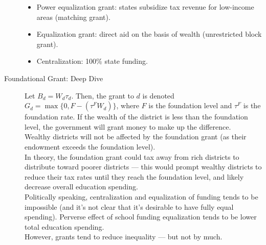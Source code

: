 \documentclass[10pt]{extarticle}
\begin{document}
\begin{description}
\begin{itemize}
          \item Power equalization grant: states subsidize tax revenue for low-income areas (matching grant).
          \item Equalization grant: direct aid on the basis of wealth (unrestricted block grant).
          \item Centralization: 100\% state funding.
        \end{itemize}
    \item[Foundational Grant: Deep Dive] Let $B_{d} = W_{d}\tau_d$. Then, the grant to $d$ is denoted $G_d = \max\{0,F - (\tau^{F}W_d)\}$, where $F$ is the foundation level and $\tau^{F}$ is the foundation rate. If the wealth of the district is less than the foundation level, the government will grant money to make up the difference.\\

      Wealthy districts will not be affected by the foundation grant (as their endowment exceeds the foundation level).\\

      In theory, the foundation grant could tax away from rich districts to distribute toward poorer districts --- this would prompt wealthy districts to reduce their tax rates until they reach the foundation level, and likely decrease overall education spending.\\

      Politically speaking, centralization and equalization of funding tends to be impossible (and it's not clear that it's desirable to have fully equal spending). Perverse effect of school funding equalization tends to be lower total education spending.\\

      However, grants tend to reduce inequality --- but not by much.
  \end{description}
\end{document}
